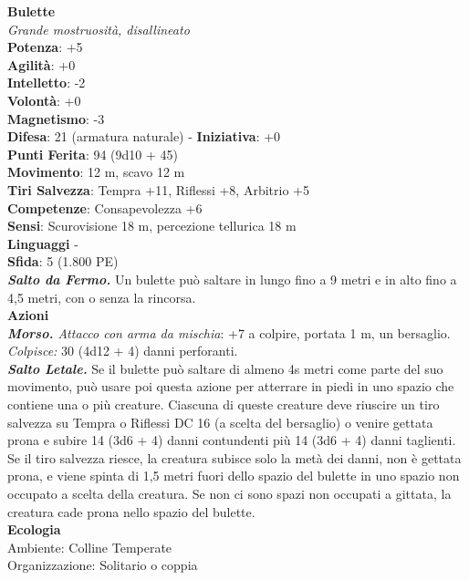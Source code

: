\begin{multicols}{2}
\medskip\textbf{Bulette}\\
\emph{Grande mostruosità, disallineato}\\
\textbf{Potenza}: +5\\
\textbf{Agilità}: +0\\
\textbf{Intelletto}: -2\\
\textbf{Volontà}: +0\\
\textbf{Magnetismo}: -3\\
\textbf{Difesa}: 21 (armatura naturale) - \textbf{Iniziativa}: +0\\
\textbf{Punti Ferita}: 94 (9d10 + 45)\\
\textbf{Movimento}: 12 m, scavo 12 m\\
\textbf{Tiri Salvezza}: Tempra +11, Riflessi +8, Arbitrio +5\\
\textbf{Competenze}: Consapevolezza +6\\
\textbf{Sensi}: Scurovisione 18 m, percezione tellurica 18 m\\
\textbf{Linguaggi} -\\
\textbf{Sfida}: 5 (1.800 PE)\smallskip\\
\emph{\textbf{Salto da Fermo.}} Un bulette può saltare in lungo fino a 9 metri e in alto fino a 4,5 metri, con o senza la rincorsa.\\
\smallskip\textbf{Azioni}\\
\emph{\textbf{Morso.} Attacco con arma da mischia}: +7 a colpire, portata 1 m, un bersaglio.\\
\emph{Colpisce:} 30 (4d12 + 4) danni perforanti.\\
\emph{\textbf{Salto Letale.}} Se il bulette può saltare di almeno 4s metri come parte del suo movimento, può usare poi questa azione per atterrare in piedi in uno spazio che contiene una o più creature. Ciascuna di queste creature deve riuscire un tiro salvezza su Tempra o Riflessi DC 16 (a scelta del bersaglio) o venire gettata prona e subire 14 (3d6 + 4) danni contundenti più 14 (3d6 + 4) danni taglienti. Se il tiro salvezza riesce, la creatura subisce solo la metà dei danni, non è gettata prona, e viene spinta di 1,5 metri fuori dello spazio del bulette in uno spazio non occupato a scelta della creatura. Se non ci sono spazi non occupati a gittata, la creatura cade prona nello spazio del bulette.\\
\textbf{Ecologia}\\
Ambiente: Colline Temperate\\
Organizzazione: Solitario o coppia\\

\end{multicols}
